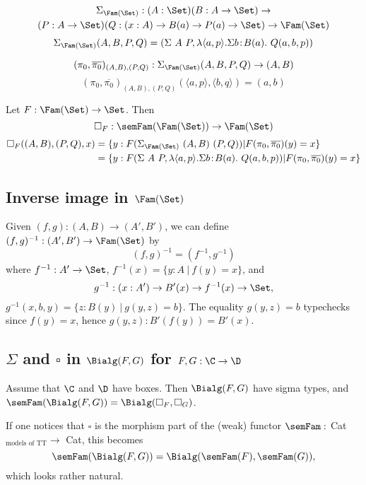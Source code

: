 \documentclass{article}
\begin{document}
\begin{multline*}
\Sigma_{\Fam(\Set)} : (A : \Set)(B : A \to \Set) \to \\
     (P : A \to \Set)(Q: (x : A) \to B(a) \to P(a) \to \Set) \to \Fam(\Set)
\end{multline*}
\[
\Sigma_{\Fam(\Set)}(A, B, P, Q) = (\Sigma\ A\ P, \lambda \langle a, p\rangle . \Sigma b\!:\!B(a).\ Q(a, b, p))
\]

\[
(\pi_0, \overline{\pi_0})_{(A, B), (P, Q)} : \Sigma_{\Fam(\Set)}(A, B, P, Q) \to (A, B)
\]
\[
(\pi_0, \overline{\pi_0})_{(A, B), (P, Q)}(\langle a, p\rangle, \langle b, q\rangle) = (a, b)
\]


Let $F : \Fam(\Set) \to \Set$. Then
\[
\square_F : \semFam(\Fam(\Set)) \to \Fam(\Set)
\]
\begin{align*}
\square_F((A, B), (P, Q), x)
 &= \{ y : F(\Sigma_{\Fam(\Set)}\ (A, B)\ (P, Q)) | F(\pi_0, \overline{\pi_0})(y) = x\} \\
 &= \{ y : F(\Sigma\ A\ P, \lambda \langle a, p\rangle . \Sigma b\!:\!B(a).\ Q(a, b, p)) | F(\pi_0, \overline{\pi_0})(y) = x\}
\end{align*}

\subsection{Inverse image in $\Fam(\Set)$}

Given $(f, g) : (A, B) \to (A', B')$, we can define $(f, g)^{-1} :
(A', B') \to \Fam(\Set)$ by
\[
(f, g)^{-1} = (f^{-1}, g^{-1})
\]
where $f^{-1} : A' \to \Set$, $f^{-1}(x) = \{ y : A\ |\ f(y) = x\}$, and 
\[
g^{-1} : (x : A') \to B'(x) \to f^{-1}(x) \to \Set,
\] 
$g^{-1}(x, b, y) = \{ z : B(y)\ |\ g(y, z) = b \}$. The equality $g(y,
z) = b$ typechecks since $f(y) = x$, hence $g(y, z) : B'(f(y)) = B'(x)$.

\subsection{$\Sigma$ and $\square$ in $\Bialg(F, G)$ for $F, G : \C \to \D$}

Assume that $\C$ and $\D$ have boxes. Then $\Bialg(F, G)$ have sigma
types, and $\semFam(\Bialg(F, G)) = \Bialg(\square_F, \square_G)$.

\begin{remark}
  If one notices that $\square$ is the morphism part of the (weak)
  functor $\semFam :$ Cat$_{\text{models of TT}} \to $ Cat, this
  becomes
  \[
  \semFam(\Bialg(F, G)) = \Bialg(\semFam(F), \semFam(G)),
  \]
  which looks rather natural.
\end{remark}
\end{document}
